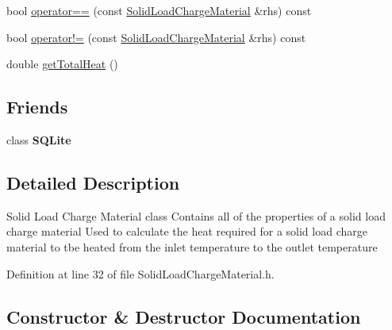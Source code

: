 \begin{DoxyCompactItemize}
\item 
bool \hyperlink{class_solid_load_charge_material_aacf2f41ce38067a52fb7d8456a05a699}{operator==} (const \hyperlink{class_solid_load_charge_material}{Solid\+Load\+Charge\+Material} \&rhs) const
\item 
bool \hyperlink{class_solid_load_charge_material_abb07f23a4dc3bfacabd2080b14034248}{operator!=} (const \hyperlink{class_solid_load_charge_material}{Solid\+Load\+Charge\+Material} \&rhs) const
\item 
double \hyperlink{class_solid_load_charge_material_af8593eb758c64236a8a026d6145584f4}{get\+Total\+Heat} ()
\end{DoxyCompactItemize}
\subsection*{Friends}
\begin{DoxyCompactItemize}
\item 
\mbox{\label{class_solid_load_charge_material_a0102f3b3c0cbf96db6c49f071fa5e7cc}} 
class {\bfseries S\+Q\+Lite}
\end{DoxyCompactItemize}


\subsection{Detailed Description}
Solid Load Charge Material class Contains all of the properties of a solid load charge material Used to calculate the heat required for a solid load charge material to tbe heated from the inlet temperature to the outlet temperature 

Definition at line 32 of file Solid\+Load\+Charge\+Material.\+h.



\subsection{Constructor \& Destructor Documentation}
\mbox{\label{class_solid_load_charge_material_a9145db5518b94cfc1919b8d6ff809f5e}} 
